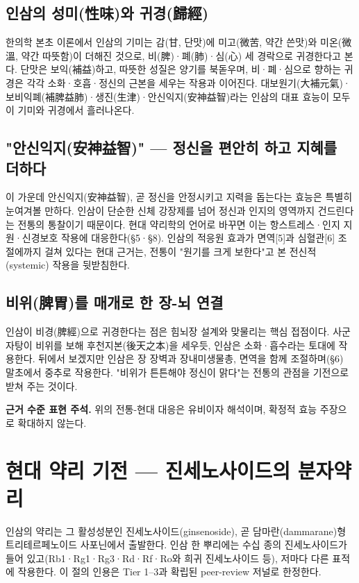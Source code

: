 \documentclass[12pt,oneside]{book}
\newenvironment{authnote}
  {\par\smallskip\begingroup\leftskip=6mm\rightskip=3mm\small\color{muted}\noindent\ignorespaces}
  {\par\endgroup\smallskip}
\begin{document}
\subsection{인삼의 성미(性味)와 귀경(歸經)}

한의학 본초 이론에서 인삼의 기미는 감(甘, 단맛)에 미고(微苦, 약간 쓴맛)와 미온(微溫, 약간 따뜻함)이 더해진 것으로, 비(脾)·폐(肺)·심(心) 세 경락으로 귀경한다고 본다. 단맛은 보익(補益)하고, 따뜻한 성질은 양기를 북돋우며, 비·폐·심으로 향하는 귀경은 각각 소화·호흡·정신의 근본을 세우는 작용과 이어진다. 대보원기(大補元氣)·보비익폐(補脾益肺)·생진(生津)·안신익지(安神益智)라는 인삼의 대표 효능이 모두 이 기미와 귀경에서 흘러나온다.

\subsection{"안신익지(安神益智)" — 정신을 편안히 하고 지혜를 더하다}

이 가운데 안신익지(安神益智), 곧 정신을 안정시키고 지력을 돕는다는 효능은 특별히 눈여겨볼 만하다. 인삼이 단순한 신체 강장제를 넘어 정신과 인지의 영역까지 건드린다는 전통의 통찰이기 때문이다. 현대 약리학의 언어로 바꾸면 이는 항스트레스·인지 지원·신경보호 작용에 대응한다(§5·§8). 인삼의 적응원 효과가 면역[5]과 심혈관[6] 조절에까지 걸쳐 있다는 현대 근거는, 전통이 "원기를 크게 보한다"고 본 전신적(systemic) 작용을 뒷받침한다.

\subsection{비위(脾胃)를 매개로 한 장-뇌 연결}

인삼이 비경(脾經)으로 귀경한다는 점은 힘뇌장 설계와 맞물리는 핵심 접점이다. 사군자탕이 비위를 보해 후천지본(後天之本)을 세우듯, 인삼은 소화·흡수라는 토대에 작용한다. 뒤에서 보겠지만 인삼은 장 장벽과 장내미생물총, 면역을 함께 조절하며(§6) 말초에서 중추로 작용한다. "비위가 튼튼해야 정신이 맑다"는 전통의 관점을 기전으로 받쳐 주는 것이다.

\begin{authnote}\textbf{근거 수준 표현 주석.} 위의 전통-현대 대응은 유비이자 해석이며, 확정적 효능 주장으로 확대하지 않는다.\end{authnote}

\section{현대 약리 기전 — 진세노사이드의 분자약리}

인삼의 약리는 그 활성성분인 진세노사이드(ginsenoside), 곧 담마란(dammarane)형 트리테르페노이드 사포닌에서 출발한다. 인삼 한 뿌리에는 수십 종의 진세노사이드가 들어 있고(Rb1·Rg1·Rg3·Rd·Rf·Ro와 희귀 진세노사이드 등), 저마다 다른 표적에 작용한다. 이 절의 인용은 Tier 1–3과 확립된 peer-review 저널로 한정한다.
\end{document}
